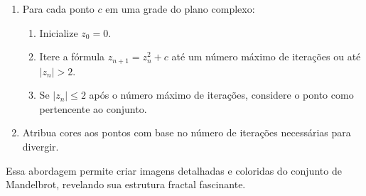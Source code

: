 \begin{enumerate}
    \item Para cada ponto $c$ em uma grade do plano complexo:
    \begin{enumerate}
        \item Inicialize $z_0 = 0$.
        \item Itere a fórmula $z_{n+1} = z_n^2 + c$ até um número máximo de iterações ou até $|z_n| > 2$.
        \item Se $|z_n| \leq 2$ após o número máximo de iterações, considere o ponto como pertencente ao conjunto.
    \end{enumerate}
    \item Atribua cores aos pontos com base no número de iterações necessárias para divergir.
\end{enumerate}

Essa abordagem permite criar imagens detalhadas e coloridas do conjunto de Mandelbrot, revelando sua estrutura fractal fascinante.